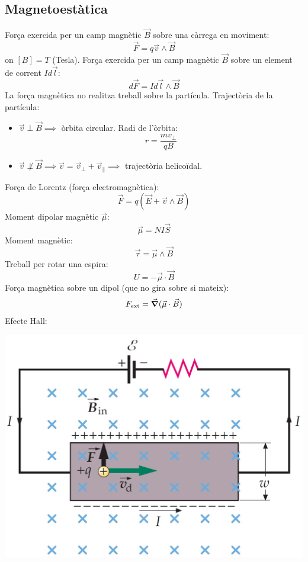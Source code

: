 \documentclass[../../../main.tex]{subfiles}
\begin{document}
\begin{multicols}{2}
    \subsection{Magnetoestàtica}
    Força exercida per un camp magnètic $\Vec{B}$ sobre una càrrega en moviment: $$\Vec{F}=q\Vec{v}\wedge\Vec{B}$$ {on $[B]=T$ (Tesla).}\newline
    Força exercida per un camp magnètic $\Vec{B}$ sobre un element de corrent $Id\Vec{l}$: $$d\Vec{F}=Id\Vec{l}\wedge\Vec{B}$$
    La força magnètica no realitza treball sobre la partícula.\newline
    Trajectòria de la partícula:
    \begin{itemize}
        \item $\Vec{v}\perp\Vec{B}\implies$ òrbita circular. Radi de l'òrbita:$$r=\frac{mv_\perp}{qB}$$
        \item $\Vec{v}\not\perp\Vec{B}\implies\Vec{v}=\Vec{v}_\perp+\Vec{v}_\parallel\implies$ trajectòria helicoïdal.
    \end{itemize}
    Força de Lorentz (força electromagnètica): $$\Vec{F}=q(\Vec{E}+\Vec{v}\wedge\Vec{B})$$
    Moment dipolar magnètic $\Vec{\mu}$: $$\Vec{\mu}=NI\Vec{S}$$
    Moment magnètic: $$\Vec{\tau}=\Vec{\mu}\wedge\Vec{B}$$
    Treball per rotar una espira: $$U=-\Vec{\mu}\cdot\Vec{B}$$
    Força magnètica sobre un dipol (que no gira sobre si mateix): $$F_{\text{ext}}=\Vec{\grad}(\Vec{\mu}\cdot\Vec{B})$$
    Efecte Hall:\newline
    \begin{minipage}{\linewidth}
        \centering
        \includegraphics[width=\linewidth]{Physics/1st/Electricity_and_magnetism/Images/hall+.jpg}

\end{minipage}
\end{multicols}
\end{document}
